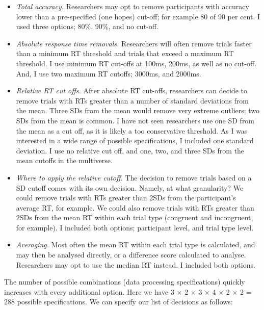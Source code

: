 \documentclass[english,man,floatsintext]{apa6}
\begin{document}
\begin{itemize}
\item
  \emph{Total accuracy.} Researchers may opt to remove participants with accuracy lower than a pre-specified (one hopes) cut-off; for example 80 of 90 per cent. I used three options; 80\%, 90\%, and no cut-off.
\item
  \emph{Absolute response time removals.} Researchers will often remove trials faster than a minimum RT threshold and trials that exceed a maximum RT threshold. I use minimum RT cut-offs at 100ms, 200ms, as well as no cut-off. And, I use two maximum RT cutoffs; 3000ms, and 2000ms.
\item
  \emph{Relative RT cut offs.} After absolute RT cut-offs, researchers can decide to remove trials with RTs greater than a number of standard deviations from the mean. Three SDs from the mean would remove very extreme outliers; two SDs from the mean is common. I have not seen researchers use one SD from the mean as a cut off, as it is likely a too conservative threshold. As I was interested in a wide range of possible specifications, I included one standard deviation. I use no relative cut off, and one, two, and three SDs from the mean cutoffs in the multiverse.
\item
  \emph{Where to apply the relative cutoff.} The decision to remove trials based on a SD cutoff comes with its own decision. Namely, at what granularity? We could remove trials with RTs greater than 2SDs from the participant's average RT, for example. We could also remove trials with RTs greater than 2SDs from the mean RT within each trial type (congruent and incongruent, for example). I included both options; participant level, and trial type level.
\item
  \emph{Averaging.} Most often the mean RT within each trial type is calculated, and may then be analysed directly, or a difference score calculated to analyse. Researchers may opt to use the median RT instead. I included both options.
\end{itemize}

The number of possible combinations (data processing specifications) quickly increases with every additional option. Here we have 3 \(\times\) 2 \(\times\) 3 \(\times\) 4 \(\times\) 2 \(\times\) 2 = 288 possible specifications. We can specify our list of decisions as follows:
\end{document}
